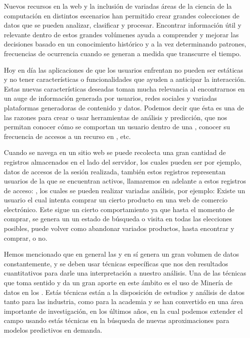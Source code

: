 %
%
%

Nuevos recursos en la web y la inclusión de variadas áreas de la ciencia de la computación	en distintos escenarios han permitido crear grandes colecciones de datos que se pueden analizar, clasificar y procesar. Encontrar información útil y relevante dentro de estos grandes volúmenes ayuda a comprender y mejorar las decisiones basado en un conocimiento histórico  y a la vez determinando patrones, frecuencias de ocurrencia cuando se generan a medida que transcurre el tiempo. 


Hoy en día las aplicaciones de \inet que los usuarios enfrentan no pueden ser estáticas y no tener características o funcionalidades que ayuden a anticipar la interacción. Estas nuevas características deseadas toman mucha relevancia al encontrarnos en un auge de información generada por usuarios, redes sociales y variadas plataformas generadoras de contenido y datos. Podemos decir que ésta es una de las razones para  crear o usar  herramientas de análisis y predicción, que nos permitan conocer cómo se comportan un usuario  dentro de una \web, conocer su frecuencia de accesos a un recurso en \inet, etc.\par

Cuando se navega en un sitio web se puede recolecta una gran cantidad de registros almacenados en el lado del servidor, los cuales pueden ser por ejemplo, datos de accesos de la sesión realizada, también estos  registros representan usuarios de la \web  que se encuentran activos, llamaremos en adelante a estos registros de acceso: \webasccesslog,   los cuales se pueden realizar variadas análisis, por ejemplo:  Existe un usuario el cual intenta comprar un cierto producto en una web de comercio electrónico. Este sigue un cierto comportamiento ya que hasta el momento de comprar, se genera un un estado de búsqueda o visita en todas las elecciones posibles, puede volver como abandonar variados productos, hasta encontrar y comprar, o no. 

Hemos mencionado  que  en general las \webs y en sí \inet genera un gran volumen de datos constantemente, y se deben usar técnicas específicas que nos den resultados cuantitativos para darle una interpretación a nuestro análisis. Una de las técnicas que toma sentido y da un gran aporte en este ámbito es el uso de Minería de datos  en los \webasccesslog.  Estás técnicas están a la disposición  de estudios y análisis de datos tanto para las industria, como para la academia y  se han convertido en una área importante  de investigación, en los últimos años, en la cual podemos extender el campo usando estás técnicas en la búsqueda de nuevas aproximaciones para modelos predictivos en demanda. 



